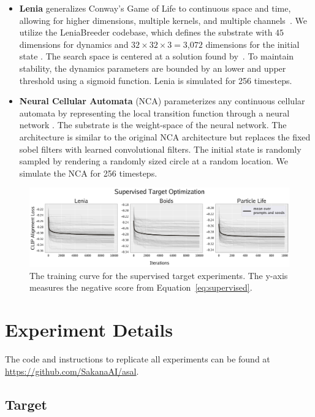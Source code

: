 \documentclass{article}
\begin{document}
\begin{itemize}
    \item
\textbf{Lenia} generalizes Conway’s Game of Life to continuous space and time, allowing for higher dimensions, multiple kernels, and multiple channels~\citep{chan2018lenia}.
We utilize the LeniaBreeder codebase, which defines the substrate with $45$ dimensions for dynamics and $32 \times 32 \times 3 = 3$,$072$ dimensions for the initial state \citep{faldor2024toward}.
The search space is centered at a solution found by~\citet{chan2020lenia}.
To maintain stability, the dynamics parameters are bounded by an lower and upper threshold using a sigmoid function.
Lenia is simulated for 256 timesteps.
    \item
\textbf{Neural Cellular Automata} (NCA) parameterizes any continuous cellular automata by representing the local transition function through a neural network \citep{mordvintsev2020growing}.
The substrate is the weight-space of the neural network.
The architecture is similar to the original NCA architecture but replaces the fixed sobel filters with learned convolutional filters.
The initial state is randomly sampled by rendering a randomly sized circle at a random location.
We simulate the NCA for 256 timesteps.


\end{itemize}

\begin{figure}[h!]
    \centering
    \includegraphics[width=1.0\linewidth]{figs/supervised_learning_curve_compressed.pdf}
    \caption{The training curve for the supervised target experiments.
    The y-axis measures the negative score from Equation~\ref{eq:supervised}.
    }
    \label{fig:supervised_learning_curve}
\end{figure}

\section{Experiment Details}
The code and instructions to replicate all experiments can be found at \href{https://github.com/SakanaAI/asal}{https://github.com/SakanaAI/asal}.
\subsection{Target}
\end{document}
